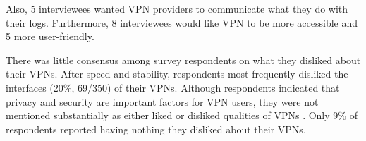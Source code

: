 Also, 5 interviewees wanted VPN providers to communicate what they do with
their logs. Furthermore, 8 interviewees would like VPN to be more accessible
and 5 more user-friendly. 

There was little consensus among survey respondents on what they disliked about their VPNs.
After speed and stability, respondents most frequently disliked the interfaces
(20\%, 69/350) of their VPNs. Although respondents indicated that privacy and
security are important factors for VPN users, they were not mentioned
substantially as either liked or disliked qualities of VPNs . Only 9\% of respondents reported
having nothing they disliked about their VPNs.

